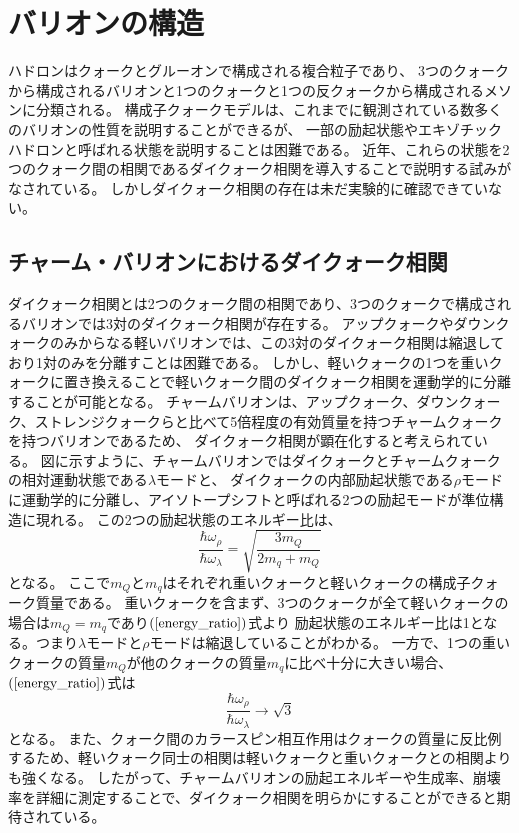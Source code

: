 \section{バリオンの構造}
ハドロンはクォークとグルーオンで構成される複合粒子であり、
3つのクォークから構成されるバリオンと1つのクォークと1つの反クォークから構成されるメソンに分類される。
構成子クォークモデルは、これまでに観測されている数多くのバリオンの性質を説明することができるが、
一部の励起状態やエキゾチックハドロンと呼ばれる状態を説明することは困難である。
近年、これらの状態を2つのクォーク間の相関であるダイクォーク相関を導入することで説明する試みがなされている\cite{ref1}。
しかしダイクォーク相関の存在は未だ実験的に確認できていない。

\subsection{チャーム・バリオンにおけるダイクォーク相関}
ダイクォーク相関とは2つのクォーク間の相関であり、3つのクォークで構成されるバリオンでは3対のダイクォーク相関が存在する。
アップクォークやダウンクォークのみからなる軽いバリオンでは、この3対のダイクォーク相関は縮退しており1対のみを分離すことは困難である。
しかし、軽いクォークの1つを重いクォークに置き換えることで軽いクォーク間のダイクォーク相関を運動学的に分離することが可能となる。
チャームバリオンは、アップクォーク、ダウンクォーク、ストレンジクォークらと比べて5倍程度の有効質量を持つチャームクォークを持つバリオンであるため、
ダイクォーク相関が顕在化すると考えられている。
図に示すように、チャームバリオンではダイクォークとチャームクォークの相対運動状態である$\lambda$モードと、
ダイクォークの内部励起状態である$\rho$モードに運動学的に分離し、アイソトープシフトと呼ばれる2つの励起モードが準位構造に現れる。
この2つの励起状態のエネルギー比は、
\begin{equation}
  \label{energy_ratio}
  \frac{\hbar\omega_{\rho}}{\hbar\omega_{\lambda}}=\sqrt{\frac{3m_{Q}}{2m_{q}+m_{Q}}}
\end{equation}
となる。
ここで$m_Q$と$m_q$はそれぞれ重いクォークと軽いクォークの構成子クォーク質量である。
重いクォークを含まず、3つのクォークが全て軽いクォークの場合は$m_Q=m_q$であり$(\ref{energy_ratio})$式より
励起状態のエネルギー比は1となる。つまり$\lambda$モードと$\rho$モードは縮退していることがわかる。
一方で、1つの重いクォークの質量$m_Q$が他のクォークの質量$m_q$に比べ十分に大きい場合、$(\ref{energy_ratio})$式は
\begin{equation}
  \label{energy_ratio2}
  \frac{\hbar\omega_{\rho}}{\hbar\omega_{\lambda}}\longrightarrow\sqrt{3}
\end{equation}
となる。
また、クォーク間のカラースピン相互作用はクォークの質量に反比例するため、軽いクォーク同士の相関は軽いクォークと重いクォークとの相関よりも強くなる。
したがって、チャームバリオンの励起エネルギーや生成率、崩壊率を詳細に測定することで、ダイクォーク相関を明らかにすることができると期待されている。
